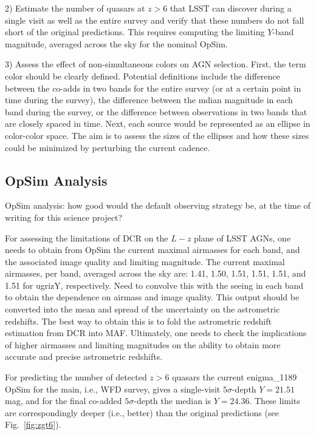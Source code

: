 2) Estimate the number of quasars at $z>6$ that LSST can discover
during a single visit as well as the entire survey and verify that
these numbers do not fall short of the original predictions. This
requires computing the limiting $Y$-band magnitude, averaged
across the sky for the nominal OpSim.

3) Assess the effect of non-simultaneous colors on AGN selection.
First, the term color should be clearly defined. Potential definitions
include the difference between the co-adds in two bands for the entire
survey (or at a certain point in time during the survey), the difference
between the mdian magnitude in each band during the survey, or the
difference between observations in two bands that are closely spaced in time.
Next, each source would be represented as an ellipse in color-color space.
The aim is to assess the sizes of the ellipses and how these sizes could be
minimized by perturbing the current cadence.



\subsection{OpSim Analysis}
\label{sec:\secname:analysis}

OpSim analysis: how good would the default observing strategy be, at
the time of writing for this science project?

For assessing the limitations of DCR on the $L-z$ plane of LSST AGNs,
one needs to obtain from OpSim the current maximal airmasses for each band,
and the associated image quality and limiting magnitude. The current maximal
airmasses, per band, averaged across the sky are: 1.41, 1.50, 1.51, 1.51, 1.51,
and 1.51 for ugrizY, respectively. Need to convolve this with the
seeing in each band to obtain the dependence on airmass and image
quality. This output should be converted into the mean and spread
of the uncertainty on the astrometric redshifts. The best way
to obtain this is to fold the astrometric redshift estimation from
DCR into MAF. Ultimately, one needs to check the implications of higher
airmasses and limiting magnitudes on the ability to obtain more accurate
and precise astrometric redshifts.

For predicting the number of detected $z>6$ quasars
the current enigma\_1189 OpSim for the main, i.e., WFD survey, gives a
single-visit $5\sigma$-depth
$Y=21.51$ mag, and for the final co-added $5\sigma$-depth the median is $Y=24.36$.
These limits are correspondingly deeper (i.e., better) than the original predictions
(see Fig.~\ref{fig:zgt6}).

